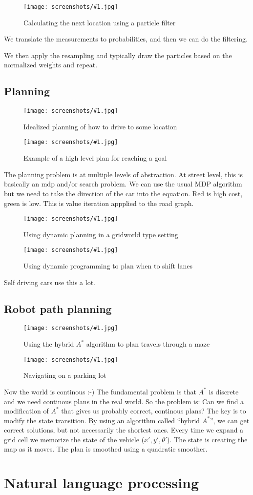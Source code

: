 \documentclass[a4, 12pt, english, USenglish]{scrreprt}
\newcommand{\screenshot}[2]{
\begin{figure}[htb]
\texttt{[image: screenshots/\#1.jpg]}
\label{#1}
\caption{#2}
\end{figure}}
\begin{document}
\screenshot{particlefiltercalculation}{Calculating the next location
  using a particle filter}

We translate the measurements to probabilities, and then we can do the filtering.

We then apply the resampling and typically draw the particles based on
the normalized weights and repeat.

\section{Planning}

\screenshot{idealizedstreetplanning}{Idealized planning of how to
  drive to some location}
\screenshot{realstreetplanning}{Example of a high level plan for
  reaching a goal}

The planning problem is at multiple levels of abstraction.  At street
level, this is basically an mdp and/or search problem.   We can use
the usual MDP algorithm but we need to take the direction of the car
into the equation.  Red is high cost, green is low.    This is value
iteration appplied to the road graph.

\screenshot{leftturndynprogramming}{Using dynamic planning in a
  gridworld type setting}
\screenshot{reallifedynamicprogramminng}{Using dynamic programming to
  plan when to shift lanes}


Self driving cars use  this a lot.

\section{Robot path planning}

\screenshot{hybridastar}{Using the hybrid \(A^*\) algorithm to plan
  travels through a maze}

\screenshot{parkinglot}{Navigating on a parking lot}

Now the world is continous :-)  The fundamental problem is that
\(A^*\) is discrete and we need continous plans in the real world.  So
the problem is: Can we find a modification of \(A^*\) that gives us
probably correct, continous plans?  The key is to modify the state
transition.  By using an algorithm called ``hybrid \(A^*\)'', we can
get correct solutions, but not necessarily the shortest ones.   Every
time we expand a grid cell we memorize the state of the vehicle (\(x',
y', \theta'\)).    The state is creating the map as it moves.  The
plan is smoothed using a quadratic smoother.

\chapter{Natural language processing}
\end{document}
